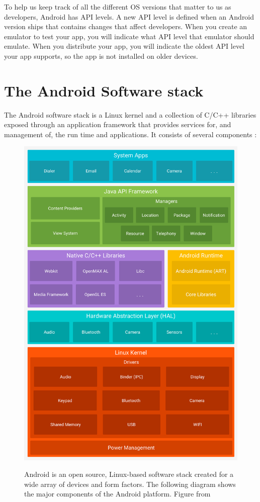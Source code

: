 To help us keep track of all the different OS versions that matter to us as developers, Android has API levels. A new API level is defined when an Android version ships that contains changes that affect developers. When you create an emulator to test your app, you will indicate what API level that emulator should emulate. When you distribute your app, you will indicate the oldest API level your app supports, so the app is not installed on older devices.

\section{The Android Software stack}
The Android software stack is a Linux kernel and a collection of C/C++ libraries exposed through an application framework that provides services for, and management of, the run time and applications. It consists of several components \cite{Google2017}:

\begin{figure}[t]
	\centering
	\includegraphics[width=\textwidth]{images/hello/android-stack.png}
	\label{fig:stack}
	\caption{Android is an open source, Linux-based software stack created for a wide array of devices and form factors. The following diagram shows the major components of the Android platform. Figure from \cite{Google2017}}
\end{figure}

